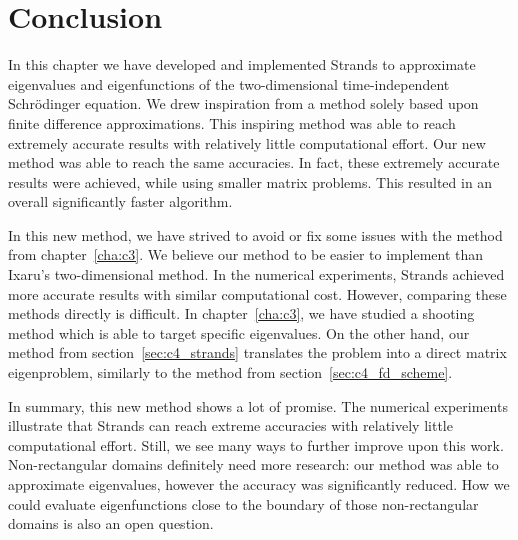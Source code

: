 





\section{Conclusion}

In this chapter we have developed and implemented Strands to approximate eigenvalues and eigenfunctions of the two-dimensional time-independent Schrödinger equation. We drew inspiration from a method solely based upon finite difference approximations. This inspiring method was able to reach extremely accurate results with relatively little computational effort. Our new method was able to reach the same accuracies. In fact, these extremely accurate results were achieved, while using smaller matrix problems. This resulted in an overall significantly faster algorithm.

In this new method, we have strived to avoid or fix some issues with the method from chapter~\ref{cha:c3}. We believe our method to be easier to implement than Ixaru's two-dimensional method. In the numerical experiments, Strands achieved more accurate results with similar computational cost. However, comparing these methods directly is difficult. In chapter~\ref{cha:c3}, we have studied a shooting method which is able to target specific eigenvalues. On the other hand, our method from section~\ref{sec:c4_strands} translates the problem into a direct matrix eigenproblem, similarly to the method from section~\ref{sec:c4_fd_scheme}.

In summary, this new method shows a lot of promise. The numerical experiments illustrate that Strands can reach extreme accuracies with relatively little computational effort. Still, we see many ways to further improve upon this work. Non-rectangular domains definitely need more research: our method was able to approximate eigenvalues, however the accuracy was significantly reduced. How we could evaluate eigenfunctions close to the boundary of those non-rectangular domains is also an open question.

